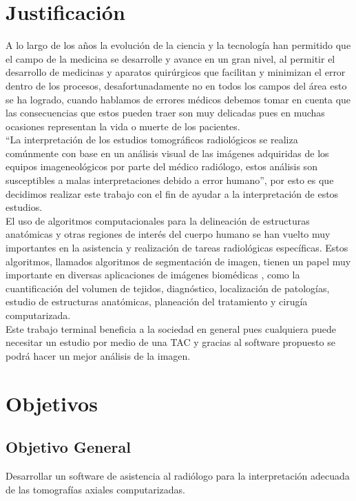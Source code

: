 \documentclass[12pt]{report}
\begin{document}
\section{Justificación}
A lo largo de los años la evolución de la ciencia y la tecnología han permitido que el campo de la medicina se desarrolle y avance en un gran nivel, al permitir el desarrollo de medicinas y aparatos quirúrgicos que facilitan y minimizan el error dentro de los procesos, desafortunadamente no en todos los campos del área esto se ha logrado, cuando hablamos de errores médicos debemos tomar en cuenta que las consecuencias que estos pueden traer son muy delicadas pues en muchas ocasiones representan la vida o muerte de los pacientes.\\ 

“La interpretación de los estudios tomográficos radiológicos se realiza comúnmente con base en un análisis visual de las imágenes adquiridas de los equipos imageneológicos por parte del médico radiólogo, estos análisis son susceptibles a malas interpretaciones debido a error humano”, por esto es que decidimos realizar este trabajo con el fin de ayudar a la interpretación de estos estudios.\\

El uso de algoritmos computacionales para la delineación de estructuras anatómicas y otras regiones de interés del cuerpo humano se han vuelto muy importantes en la asistencia y realización de tareas radiológicas específicas. Estos algoritmos, llamados algoritmos de segmentación de imagen, tienen un papel muy importante en diversas aplicaciones de imágenes biomédicas , como la cuantificación del volumen de tejidos, diagnóstico, localización de patologías, estudio de estructuras anatómicas, planeación del tratamiento y cirugía computarizada.\cite{metodos}\\ 

Este trabajo terminal beneficia a la sociedad en general pues cualquiera puede necesitar un estudio por medio de una TAC y gracias al software propuesto se  podrá hacer un mejor análisis de la imagen.

\section{Objetivos}
\subsection{Objetivo General}
Desarrollar un software de asistencia al radiólogo para la interpretación adecuada de las tomografías axiales computarizadas.
\end{document}
